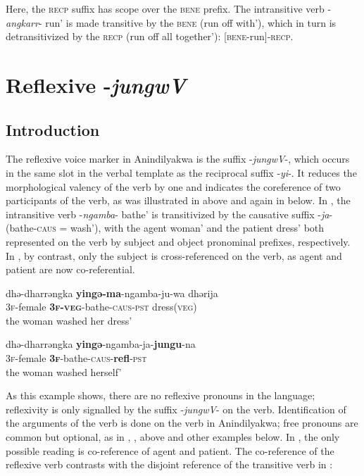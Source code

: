 \documentclass[output=paper]{langscibook}
\begin{document}
Here, the \textsc{recp} suffix has scope over the \textsc{bene} prefix. The intransitive verb -\textit{angkarr}- run’ is made transitive by the \textsc{bene} (run off with’), which in turn is detransitivized by the \textsc{recp} (run off all together’): [\textsc{bene}-run]-\textsc{recp}.


\section{Reflexive -\textit{jungwV}}
\label{sec:vanegmond:3}

\subsection{Introduction}
\label{sec:vanegmond:3.1}

The reflexive voice marker in Anindilyakwa is the suffix -\textit{jungwV}-, which occurs in the same slot in the verbal template as the reciprocal suffix -\textit{yi}-. It reduces the morphological valency of the verb by one and indicates the coreference of two participants of the verb, as was illustrated in  above and again in  below. In , the intransitive verb -\textit{ngamba}- bathe’ is transitivized by the causative suffix -\textit{ja}- (bathe-\textsc{caus} = wash’), with the agent woman’ and the patient dress’ both represented on the verb by subject and object pronominal prefixes, respectively. In , by contrast, only the subject is cross-referenced on the verb, as agent and patient are now co-referential.


\ea%
 \label{ex:vanegmond:18}

 \ea
 \label{ex:vanegmond:18a}
\gll dhə-dharrəngka \textbf{yingə-ma}-ngamba-ju-wa dhərija\\
\textsc{3f-}female \textbf{\textsc{3f}}\textbf{-}\textbf{\textsc{veg}}-bathe-\textsc{caus}-\textsc{pst} dress(\textsc{veg})\\
\glt the woman washed her dress’


\ex
\label{ex:vanegmond:18b}
\gll dhə-dharrəngka \textbf{yingə}{-ngamba-ja-}\textbf{jungu}-na\\
\textsc{3f}-female \textbf{\textsc{3f}}-bathe-\textsc{caus}-\textbf{refl}-\textsc{pst}\\
\glt the woman washed herself’
\z
\z


As this example shows, there are no reflexive pronouns in the language; reflexivity is only signalled by the suffix -\textit{jungwV}- on the verb. Identification of the arguments of the verb is done on the verb in Anindilyakwa; free pronouns are common but optional, as in , ,  above and other examples below.
In , the only possible reading is co-reference of agent and patient. The co-reference of the reflexive verb contrasts with the disjoint reference of the transitive verb in :
\end{document}

